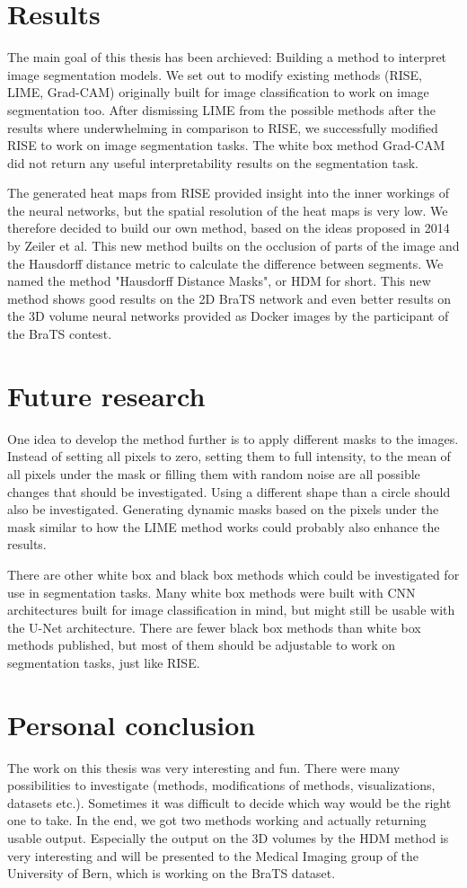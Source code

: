 \section{Results}
The main goal of this thesis has been archieved: Building a method to interpret image segmentation models. We set out to modify existing methods (RISE, LIME, Grad-CAM) originally built for image classification to work on image segmentation too. After dismissing LIME from the possible methods after the results where underwhelming in comparison to RISE, we successfully modified RISE to work on image segmentation tasks. The white box method Grad-CAM did not return any useful interpretability results on the segmentation task.

The generated heat maps from RISE provided insight into the inner workings of the neural networks, but the spatial resolution of the heat maps is very low. We therefore decided to build our own method, based on the ideas proposed in 2014 by Zeiler et al. This new method builts on the occlusion of parts of the image and the Hausdorff distance metric to calculate the difference between segments. We named the method "Hausdorff Distance Masks", or HDM for short. This new method shows good results on the 2D BraTS network and even better results on the 3D volume neural networks provided as Docker images by the participant of the BraTS contest.

\section{Future research}
One idea to develop the method further is to apply different masks to the images. Instead of setting all pixels to zero, setting them to full intensity, to the mean of all pixels under the mask or filling them with random noise are all possible changes that should be investigated. Using a different shape than a circle should also be investigated. Generating dynamic masks based on the pixels under the mask similar to how the LIME method works could probably also enhance the results.

There are other white box and black box methods which could be investigated for use in segmentation tasks. Many white box methods were built with CNN architectures built for image classification in mind, but might still be usable with the U-Net architecture. There are fewer black box methods than white box methods published, but most of them should be adjustable to work on segmentation tasks, just like RISE.

\section{Personal conclusion}
The work on this thesis was very interesting and fun. There were many possibilities to investigate (methods, modifications of methods, visualizations, datasets etc.). Sometimes it was difficult to decide which way would be the right one to take. In the end, we got two methods working and actually returning usable output. Especially the output on the 3D volumes by the HDM method is very interesting and will be presented to the Medical Imaging group of the University of Bern, which is working on the BraTS dataset.
